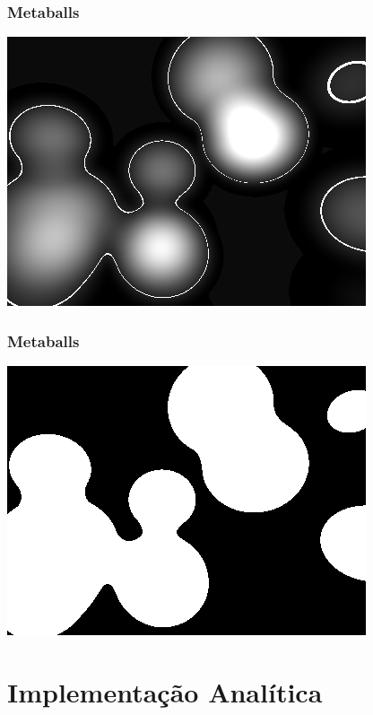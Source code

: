 \documentclass[brazil]{beamer}
\begin{document}
    \begin{frame}
      \frametitle{Metaballs}
        \begin{center}
          \includegraphics[width=.7\textwidth]{imgs/metaball-2d-2.png}
        \end{center}
    \end{frame}

    \begin{frame}
      \frametitle{Metaballs}
        \begin{center}
          \includegraphics[width=.7\textwidth]{imgs/metaball-2d-3.png}
        \end{center}
    \end{frame}


  \section*{Implementação Analítica}
    \subsection{}
        
\end{document}
